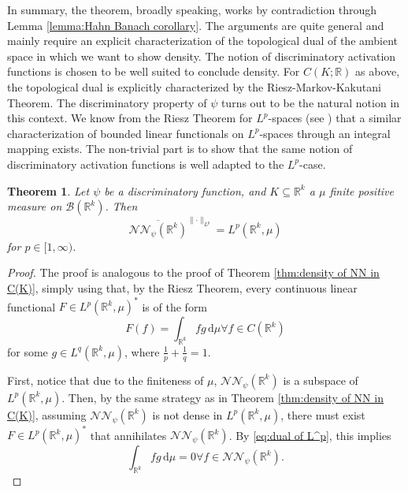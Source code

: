 \documentclass[11pt,a4paper,twoside,openany]{report}
\numberwithin{equation}{section}
\newcommand{\diff}{\mathrm{d}}
\theoremstyle{plain} %
\newtheorem{theorem}{Theorem}[section]
\theoremstyle{definition} %
\theoremstyle{remark} %
\let\parencite\authnumparencite
\begin{document}
In summary, the theorem, broadly speaking, works by contradiction through Lemma \ref{lemma:Hahn Banach corollary}. The arguments are quite general and mainly require an explicit characterization of the topological dual of the ambient space in which we want to show density. The notion of  discriminatory activation functions is chosen to be well suited to conclude density.
For \(C(K;\mathbb{R})\) as above, the topological dual is explicitly characterized by the Riesz-Markov-Kakutani Theorem. The discriminatory property of \(\psi\) turns out to be the natural notion in this context. We know from the Riesz Theorem for \(L^p\)-spaces (see \parencite[Thm.~4.4.1.]{Bogachev2007MeasureTheory}) that a similar characterization of bounded linear functionals on \(L^p\)-spaces through an integral mapping exists. The non-trivial part is to show that the same notion of discriminatory activation functions is well adapted to the \(L^p\)-case.
\begin{theorem}\label{thm:density of NN in L^p}
    Let \(\psi\) be a discriminatory function, and \(K\subseteq\mathbb{R}^k\) a \(\mu\) finite positive measure on \(\mathcal{B}(\mathbb{R}^k)\). Then
    \begin{equation*}
         \overline{\mathcal{NN}_{\psi}(\mathbb{R}^k)}^{\lVert\cdot\rVert_{L^p}}=L^p(\mathbb{R}^k,\mu)
    \end{equation*}
    for \(p\in[1,\infty)\).
\end{theorem}
\begin{proof}
    The proof is analogous to the proof of Theorem \ref{thm:density of NN in C(K)}, simply using that, by the Riesz Theorem, every continuous linear functional  \(F\in L^p(\mathbb{R}^k,\mu)^*\) is of the form
    \begin{equation}\label{eq:dual of L^p}
        F(f)=\int_{\mathbb{R}^k}fg\,\diff \mu\forall f\in C(\mathbb{R}^k)
    \end{equation} for some \(g\in L^q(\mathbb{R}^k,\mu)\), where \(\frac{1}{p}+\frac{1}{q}=1\). 

    
   First, notice that due to the finiteness of \(\mu\), \(\mathcal{NN}_{\psi}(\mathbb{R}^k)\) is a subspace of  \(L^p(\mathbb{R}^k,\mu)\). Then, by the same strategy as in Theorem \ref{thm:density of NN in C(K)}, assuming \(\mathcal{NN}_{\psi}(\mathbb{R}^k)\) is not dense in \(L^p(\mathbb{R}^k,\mu)\), there must exist \(F\in L^p(\mathbb{R}^k,\mu)^*\) that annihilates \(\mathcal{NN}_{\psi}(\mathbb{R}^k)\). By \eqref{eq:dual of L^p}, this implies
    \begin{equation}\label{eq:Lp Riesz}
        \int_{\mathbb{R}^k}fg\,\diff \mu=0\forall f\in \mathcal{NN}_{\psi}(\mathbb{R}^k).
    \end{equation}
\end{proof}
\end{document}
